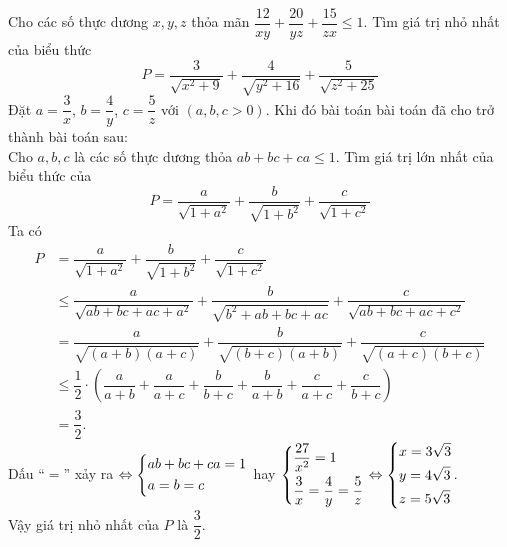 \begin{ex}%
	Cho các số thực dương $x,y,z$ thỏa mãn $\dfrac{12}{xy}+\dfrac{20}{yz}+\dfrac{15}{zx}\le 1$. Tìm giá trị nhỏ nhất của biểu thức $$P=\dfrac{3}{\sqrt{x^2+9}}+\dfrac{4}{\sqrt{y^2+16}}+\dfrac{5}{\sqrt{z^2+25}}$$
	\loigiai
	{
		Đặt $a=\dfrac{3}{x}$, $b=\dfrac{4}{y}$, $c=\dfrac{5}{z}$ với $(a,b,c >0)$. Khi đó bài toán bài toán đã cho trở thành bài toán sau:\\
		Cho $a,b,c$ là các số thực dương thỏa $ab+bc+ca \le 1$. Tìm giá trị lớn nhất của biểu thức của $$P=\dfrac{a}{\sqrt{1+a^2}} + \dfrac{b}{\sqrt{1+b^2}} + \dfrac{c}{\sqrt{1+c^2}}$$
		Ta có
		\begin{align*}
			P&=\dfrac{a}{\sqrt{1+a^2}} + \dfrac{b}{\sqrt{1+b^2}} + \dfrac{c}{\sqrt{1+c^2}} \\
			&\le \dfrac{a}{\sqrt{ab+bc+ac+a^2}} + \dfrac{b}{\sqrt{b^2+ab+bc+ac}} + \dfrac{c}{\sqrt{ab+bc+ac+c^2}} \\
			&=\dfrac{a}{\sqrt{(a+b)(a+c)}} + \dfrac{b}{\sqrt{(b+c)(a+b)}} + \dfrac{c}{\sqrt{(a+c)(b+c)}} \\
			&\le \dfrac{1}{2} \cdot \left( \dfrac{a}{a+b} + \dfrac{a}{a+c} + \dfrac{b}{b+c} + \dfrac{b}{a+b} + \dfrac{c}{a+c} + \dfrac{c}{b+c} \right) \\
			&=\dfrac{3}{2}.
		\end{align*}
		Dấu ``$=$'' xảy ra $\Leftrightarrow \left\{\begin{aligned}&ab+bc+ca=1 \\ &a=b=c\end{aligned}\right.$ hay $\left\{\begin{aligned}&\dfrac{27}{x^2} = 1 \\ &\dfrac{3}{x}=\dfrac{4}{y}=\dfrac{5}{z}\end{aligned}\right. \Leftrightarrow \left\{\begin{aligned}&x=3\sqrt{3} \\ & y=4\sqrt{3} \\ &z=5\sqrt{3}\end{aligned}\right.$. \\
		Vậy giá trị nhỏ nhất của $P$ là $\dfrac{3}{2}$.
	}	 
\end{ex}
